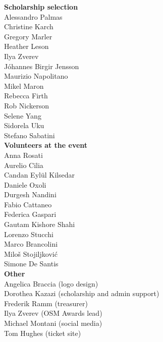 \begin{multicols}{2}
\begin{small}
    \vspace{\volunteerSpace}
    \textbf{Scholarship selection}\\
    Alessandro Palmas\\
    Christine Karch\\
    Gregory Marler\\
    Heather Leson\\
    Ilya Zverev\\
    Jóhannes Birgir Jensson\\
    Maurizio Napolitano\\
    Mikel Maron\\
    Rebecca Firth\\
    Rob Nickerson\\
    Selene Yang\\
    Sidorela Uku\\
    Stefano Sabatini\\

    \vspace{\volunteerSpace}
    \textbf{Volunteers at the event}\\
    Anna Rosati\\
    Aurelio Cilia\\
    Candan Eylül Kilsedar\\
    Daniele Oxoli\\
    Durgesh Nandini\\
    Fabio Cattaneo\\
    Federica Gaspari\\
    Gautam Kishore Shahi\\
    Lorenzo Stucchi\\
    Marco Brancolini\\
    Miloš Stojiljković\\
    Simone De Santis\\

    \vspace{\volunteerSpace}
    \textbf{Other}\\
    Angelica Braccia (logo design)\\
    Dorothea Kazazi (scholarship and admin support)\\
    Frederik Ramm (treasurer)\\
    Ilya Zverev (OSM Awards lead)\\
    Michael Montani (social media)\\
    Tom Hughes (ticket site)\\
  \end{small}
\end{multicols}
\justifying

\newpage
\pagestyle{sponsor-microsoft}
\null
\newpage
\pagestyle{sponsor-facebook}
\null
\newpage
\pagestyle{sponsor-mapbox}
\null
\newpage
